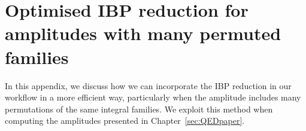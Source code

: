 \documentclass[main.tex]{subfiles}
\begin{document}
\renewcommand{\theequation}{A.\arabic{equation}}

\chapter[Optimised IBP reduction for many permuted families]{Optimised IBP reduction for amplitudes with many permuted families} \label{app:altIBPs}
In this appendix, we discuss how we can incorporate the IBP reduction in our workflow in a more efficient way, particularly when the amplitude includes many permutations of the same integral families. We exploit this method when computing the amplitudes presented in Chapter~\ref{sec:QEDpaper}.
\end{document}
